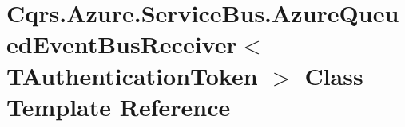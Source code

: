 \hypertarget{classCqrs_1_1Azure_1_1ServiceBus_1_1AzureQueuedEventBusReceiver}{}\section{Cqrs.\+Azure.\+Service\+Bus.\+Azure\+Queued\+Event\+Bus\+Receiver$<$ T\+Authentication\+Token $>$ Class Template Reference}
\label{classCqrs_1_1Azure_1_1ServiceBus_1_1AzureQueuedEventBusReceiver}
